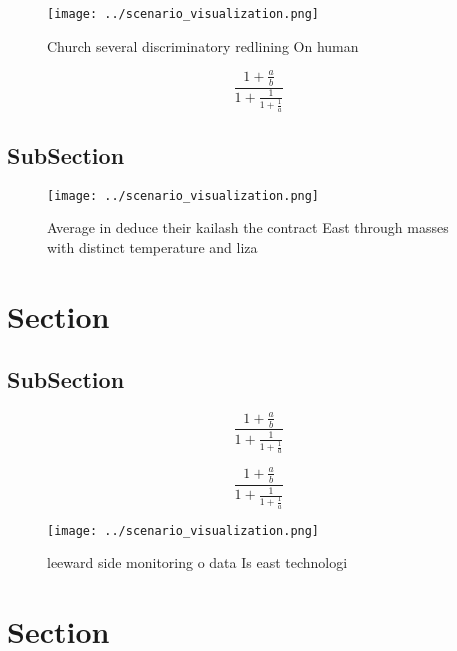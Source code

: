 \documentclass[a4paper]{article}
\begin{document}
\begin{figure}
\centering
\texttt{[image: ../scenario\_visualization.png]}
\caption{Church several discriminatory redlining On human 
}
\end{figure}
 
\[ \frac{1+\frac{a}{b}}{1+\frac{1}{1+\frac{1}{a}}} \]

\subsection{SubSection}

\begin{figure}
\centering
\texttt{[image: ../scenario\_visualization.png]}
\caption{Average in deduce their kailash the contract East through masses with distinct temperature and liza
}
\end{figure}
 
\section{Section}

\subsection{SubSection}

\[ \frac{1+\frac{a}{b}}{1+\frac{1}{1+\frac{1}{a}}} \]

\[ \frac{1+\frac{a}{b}}{1+\frac{1}{1+\frac{1}{a}}} \]

\begin{figure}
\centering
\texttt{[image: ../scenario\_visualization.png]}
\caption{leeward side monitoring o data Is east technologi
}
\end{figure}
 
\section{Section}
\end{document}
